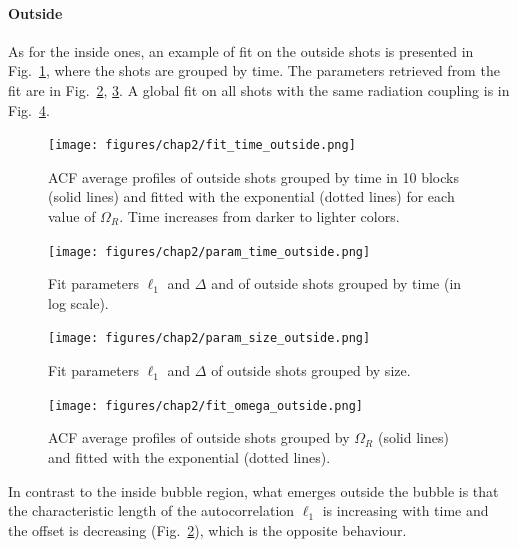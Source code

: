 \paragraph{Outside}
As for the inside ones, an example of fit on the outside shots is presented in Fig.\ \ref{fig:fit_time_outside}, where the shots are grouped by time. The parameters retrieved from the fit are in Fig.\ \ref{fig:param_time_outside}, \ref{fig:param_size_outside}. A global fit on all shots with the same radiation coupling is in Fig.\ \ref{fig:fit_omega_outside}.
\begin{figure}[h!]
    \centering
    \texttt{[image: figures/chap2/fit\_time\_outside.png]}
    \caption{ACF average profiles of outside shots grouped by time in 10 blocks (solid lines) and fitted with the exponential (dotted lines) for each value of $\Omega_R$. Time increases from darker to lighter colors.}
    \label{fig:fit_time_outside}
\end{figure}
\begin{figure}[h!]
    \centering
    \texttt{[image: figures/chap2/param\_time\_outside.png]}
    \caption{Fit parameters $\ell_1$ and $\Delta$ and of outside shots grouped by time (in log scale).}
    \label{fig:param_time_outside}
\end{figure}
\begin{figure}[h!]
    \centering
    \texttt{[image: figures/chap2/param\_size\_outside.png]}
    \caption{Fit parameters $\ell_1$ and $\Delta$ of outside shots grouped by size.}
    \label{fig:param_size_outside}
\end{figure}
\begin{figure}[h!]
    \centering
    \texttt{[image: figures/chap2/fit\_omega\_outside.png]}
    \caption{ACF average profiles of outside shots grouped by $\Omega_R$ (solid lines) and fitted with the exponential (dotted lines).}
    \label{fig:fit_omega_outside}
\end{figure}
In contrast to the inside bubble region, what emerges outside the bubble is that the characteristic length of the autocorrelation $\ell_1$ is increasing with time and the offset is decreasing (Fig.\ \ref{fig:param_time_outside}), which is the opposite behaviour.

